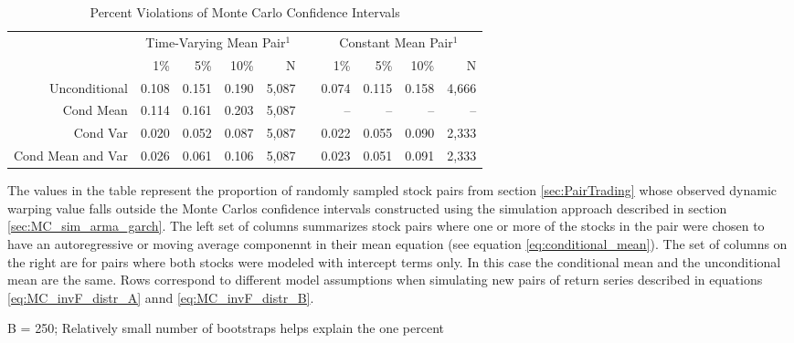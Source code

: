 \documentclass[12pt]{article}
\begin{document}
\begin{table}
    \fontsize{11pt}{11pt}\selectfont
    \centering
    \begin{tabular}{r r r r r r r r r r}
        \hline
                          & \multicolumn{4}{c}{Time-Varying Mean Pair$^{1}$} & & \multicolumn{4}{c}{Constant Mean Pair$^{1}$} \\ \cline{2-10}
                          & 1\%   & 5\%   & 10\%  & N     & & 1\%   & 5\%    & 10\%  & N  \\
        Unconditional     & 0.108 & 0.151 & 0.190 & 5,087 & & 0.074 &  0.115 & 0.158 & 4,666 \\
        Cond Mean         & 0.114 & 0.161 & 0.203 & 5,087 & &    -- &     -- &    -- &   -- \\
        Cond Var          & 0.020 & 0.052 & 0.087 & 5,087 & & 0.022 &  0.055 & 0.090 & 2,333 \\
        Cond Mean and Var & 0.026 & 0.061 & 0.106 & 5,087 & & 0.023 &  0.051 & 0.091 & 2,333 \\
        \hline
    \end{tabular}
    \caption{Percent Violations of Monte Carlo Confidence Intervals}
    \begin{tablenotes}
        \item{The values in the table represent the proportion of randomly sampled stock pairs from section \ref{sec:PairTrading} whose observed dynamic warping value falls outside the Monte Carlos confidence intervals constructed using the simulation approach described in section \ref{sec:MC_sim_arma_garch}. The left set of columns summarizes stock pairs where one or more of the stocks in the pair were chosen to have an autoregressive or moving average componennt in their mean equation (see equation \ref{eq:conditional_mean}). The set of columns on the right are for pairs where both stocks were modeled with intercept terms only. In this case the conditional mean and the unconditional mean are the same. Rows correspond to different model assumptions when simulating new pairs of return series described in equations \ref{eq:MC_invF_distr_A} annd \ref{eq:MC_invF_distr_B}.}
        \item B = 250; Relatively small number of bootstraps helps explain the one percent
    \end{tablenotes}
    \label{tbl:monte_carlo_confidence_intervals}
\end{table}
\end{document}
